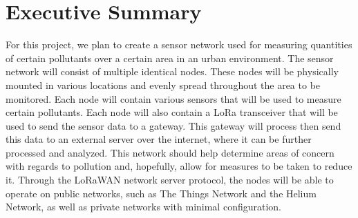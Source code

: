 \section{Executive Summary}
For this project, we plan to create a sensor network used for measuring
quantities of certain pollutants over a certain area in an urban environment.
The sensor network will consist of multiple identical nodes. These nodes will be
physically mounted in various locations and evenly spread throughout the area to
be monitored. Each node will contain various sensors that will be used to
measure certain pollutants. Each node will also contain a LoRa transceiver that
will be used to send the sensor data to a gateway. This gateway will process
then send this data to an external server over the internet, where it can be
further processed and analyzed. This network should help determine areas of
concern with regards to pollution and, hopefully, allow for measures to be taken
to reduce it. Through the LoRaWAN network server protocol, the nodes will be
able to operate on public networks, such as The Things Network and the Helium
Network, as well as private networks with minimal configuration.

